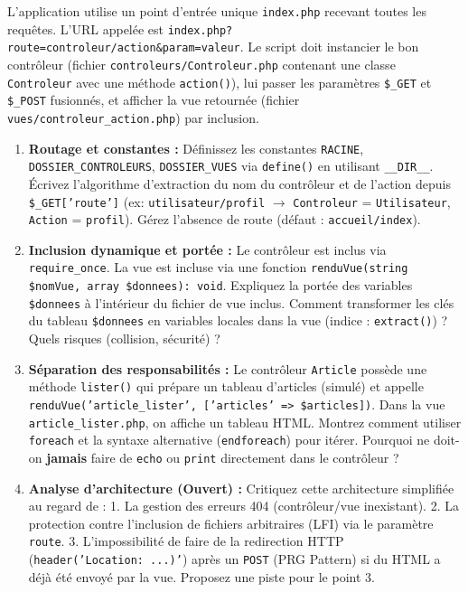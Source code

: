 \documentclass[11pt]{article}
\begin{document}
\begin{exercice}
L'application utilise un point d'entrée unique \texttt{index.php} recevant toutes les requêtes. L'URL appelée est \texttt{index.php?route=controleur/action\&param=valeur}. Le script doit instancier le bon contrôleur (fichier \texttt{controleurs/Controleur.php} contenant une classe \texttt{Controleur} avec une méthode \texttt{action()}), lui passer les paramètres \texttt{\$\_GET} et \texttt{\$\_POST} fusionnés, et afficher la vue retournée (fichier \texttt{vues/controleur\_action.php}) par inclusion.

\begin{enumerate}
    \item \textbf{Routage et constantes :} Définissez les constantes \texttt{RACINE}, \texttt{DOSSIER\_CONTROLEURS}, \texttt{DOSSIER\_VUES} via \texttt{define()} en utilisant \texttt{\_\_DIR\_\_}. Écrivez l'algorithme d'extraction du nom du contrôleur et de l'action depuis \texttt{\$\_GET['route']} (ex: \texttt{utilisateur/profil} $\to$ \texttt{Controleur} = \texttt{Utilisateur}, \texttt{Action} = \texttt{profil}). Gérez l'absence de route (défaut : \texttt{accueil/index}).
    \item \textbf{Inclusion dynamique et portée :} Le contrôleur est inclus via \texttt{require\_once}. La vue est incluse via une fonction \texttt{renduVue(string \$nomVue, array \$donnees): void}. Expliquez la portée des variables \texttt{\$donnees} à l'intérieur du fichier de vue inclus. Comment transformer les clés du tableau \texttt{\$donnees} en variables locales dans la vue (indice : \texttt{extract()}) ? Quels risques (collision, sécurité) ?
    \item \textbf{Séparation des responsabilités :} Le contrôleur \texttt{Article} possède une méthode \texttt{lister()} qui prépare un tableau d'articles (simulé) et appelle \texttt{renduVue('article\_lister', ['articles' => \$articles])}. Dans la vue \texttt{article\_lister.php}, on affiche un tableau HTML. Montrez comment utiliser \texttt{foreach} et la syntaxe alternative (\texttt{endforeach}) pour itérer. Pourquoi ne doit-on \textbf{jamais} faire de \texttt{echo} ou \texttt{print} directement dans le contrôleur ?
    \item \textbf{Analyse d'architecture (Ouvert) :} Critiquez cette architecture simplifiée au regard de : 1. La gestion des erreurs 404 (contrôleur/vue inexistant). 2. La protection contre l'inclusion de fichiers arbitraires (LFI) via le paramètre \texttt{route}. 3. L'impossibilité de faire de la redirection HTTP (\texttt{header('Location: ...)'}) après un \texttt{POST} (PRG Pattern) si du HTML a déjà été envoyé par la vue. Proposez une piste pour le point 3.
\end{enumerate}
\end{exercice}
\end{document}
